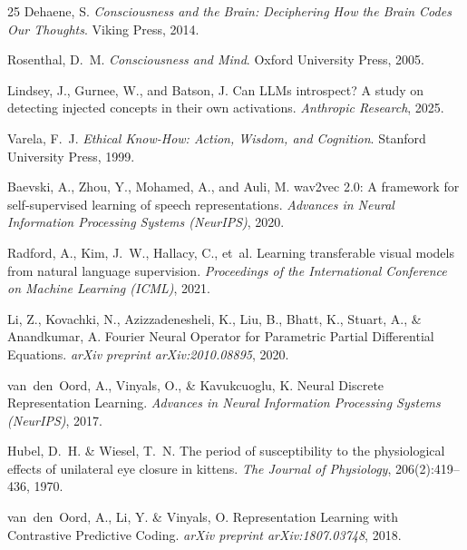 \documentclass[11pt,a4paper,twocolumn]{article}
\begin{document}
\begin{thebibliography}{25}
Dehaene, S.
\emph{Consciousness and the Brain: Deciphering How the Brain Codes Our Thoughts}.
Viking Press, 2014.

Rosenthal, D.~M.
\emph{Consciousness and Mind}.
Oxford University Press, 2005.

Lindsey, J., Gurnee, W., and Batson, J.
Can LLMs introspect? A study on detecting injected concepts in their own activations.
\emph{Anthropic Research}, 2025.

Varela, F.~J.
\emph{Ethical Know-How: Action, Wisdom, and Cognition}.
Stanford University Press, 1999.

Baevski, A., Zhou, Y., Mohamed, A., and Auli, M.
wav2vec 2.0: A framework for self-supervised learning of speech representations.
\emph{Advances in Neural Information Processing Systems (NeurIPS)}, 2020.

Radford, A., Kim, J.~W., Hallacy, C., et~al.
Learning transferable visual models from natural language supervision.
\emph{Proceedings of the International Conference on Machine Learning (ICML)}, 2021.

Li, Z., Kovachki, N., Azizzadenesheli, K., Liu, B., Bhatt, K., Stuart, A., \& Anandkumar, A.
\newblock Fourier Neural Operator for Parametric Partial Differential Equations.
\newblock \emph{arXiv preprint arXiv:2010.08895}, 2020.

van~den~Oord, A., Vinyals, O., \& Kavukcuoglu, K.
\newblock Neural Discrete Representation Learning.
\newblock \emph{Advances in Neural Information Processing Systems (NeurIPS)}, 2017.

Hubel, D.~H. \& Wiesel, T.~N.
\newblock The period of susceptibility to the physiological effects of unilateral eye closure in kittens.
\newblock \emph{The Journal of Physiology}, 206(2):419--436, 1970.

van~den~Oord, A., Li, Y. \& Vinyals, O.
\newblock Representation Learning with Contrastive Predictive Coding.
\newblock \emph{arXiv preprint arXiv:1807.03748}, 2018.

\end{thebibliography}
\end{document}
